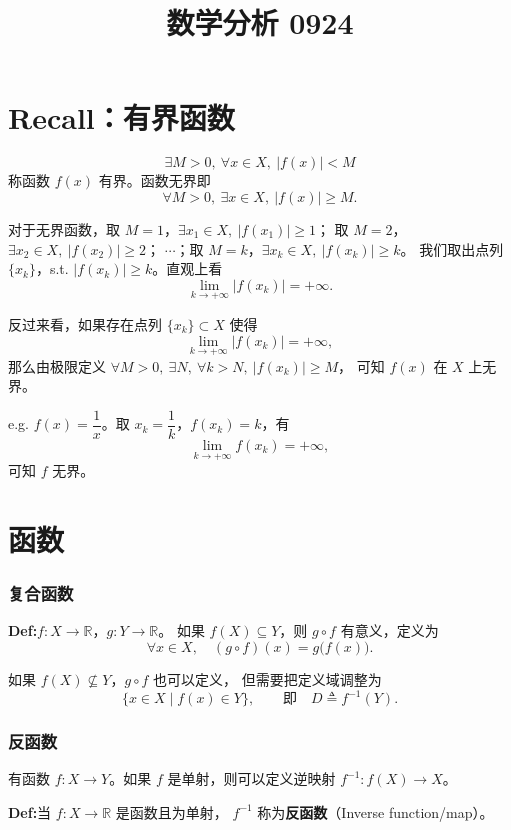 \documentclass[UTF8,11pt]{ctexart}
\title{数学分析 0924}
\date{}
\theoremstyle{cnthm}
\begin{document}
\maketitle

\section{Recall：有界函数}

\[
\exists M>0,\ \forall x\in X,\ |f(x)|<M
\]
称函数 $f(x)$ 有界。函数无界即
\[
\forall M>0,\ \exists x\in X,\ |f(x)|\geq M .
\]

对于无界函数，取 $M=1$，$\exists x_1\in X,\ |f(x_1)|\geq1$；
取 $M=2$，$\exists x_2\in X,\ |f(x_2)|\geq2$；
$\cdots$；取 $M=k$，$\exists x_k\in X,\ |f(x_k)|\geq k$。
我们取出点列 $\{x_k\}$，s.t. $|f(x_k)|\geq k$。直观上看
\[
\lim_{k\to+\infty}|f(x_k)|=+\infty .
\]

反过来看，如果存在点列 $\{x_k\}\subset X$ 使得
\[
\lim_{k\to+\infty}|f(x_k)|=+\infty,
\]
那么由极限定义
$\forall M>0,\ \exists N,\ \forall k>N,\ |f(x_k)|\geq M$，
可知 $f(x)$ 在 $X$ 上无界。

e.g. $f(x)=\dfrac1x$。取 $x_k=\dfrac1k$，$f(x_k)=k$，有
\[
\lim_{k\to+\infty}f(x_k)=+\infty,
\]
可知 $f$ 无界。

\section{函数}

\subsubsection*{复合函数}

\textbf{Def:}\quad $f:X\to\mathbb R$，$g:Y\to\mathbb R$。
如果 $f(X)\subseteq Y$，则 $g\circ f$ 有意义，定义为
\[
\forall x\in X,\quad (g\circ f)(x)=g\bigl(f(x)\bigr).
\]

如果 $f(X)\nsubseteq Y$，$g\circ f$ 也可以定义，
但需要把定义域调整为
\[
\{x\in X\mid f(x)\in Y\},\qquad\text{即}\quad D\triangleq f^{-1}(Y).
\]

\subsubsection*{反函数}

有函数 $f:X\to Y$。如果 $f$ 是单射，则可以定义逆映射
$f^{-1}:f(X)\to X$。

\textbf{Def:}\quad 当 $f:X\to\mathbb R$ 是函数且为单射，
$f^{-1}$ 称为\textbf{反函数}（Inverse function/map）。
\end{document}
